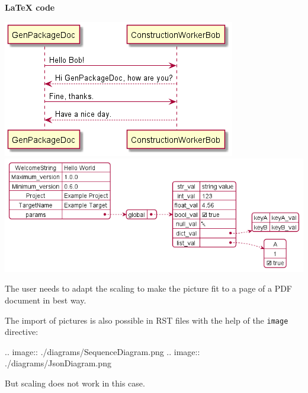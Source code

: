 \vspace{2ex}

\textbf{LaTeX code}

\begin{pythoncode}
   \includegraphics[scale=0.7]{./diagrams/SequenceDiagram.png}
   \includegraphics[scale=0.6]{./diagrams/JsonDiagram.png}
\end{pythoncode}

The user needs to adapt the scaling to make the picture fit to a page of a PDF document in best way.

\vspace{2ex}

The import of pictures is also possible in RST files with the help of the \texttt{image} directive:

\begin{pythoncode}
   .. image:: ./diagrams/SequenceDiagram.png
   .. image:: ./diagrams/JsonDiagram.png
\end{pythoncode}

But scaling does not work in this case.


